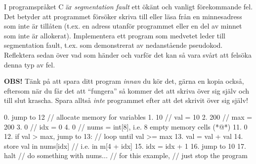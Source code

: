 \begin{Extrauppgifter}
    \item {}
    I programspråket C är \emph{segmentation fault} ett ökänt och vanligt förekommande fel. Det betyder att programmet försöker skriva till eller läsa från en minnesadress som inte är tillåten (t.ex. en adress utanför programmet eller en del av minnet som inte är allokerat).    
    Implementera ett program som medvetet leder till segmentation fault, t.ex. som demonstrerat av nedanstående pseudokod. Reflektera sedan över vad som händer och varför det kan så vara svårt att felsöka denna typ av fel.

    \halfblankline
    \textbf{OBS!} Tänk på att spara ditt program \emph{innan} du kör det, gärna en kopia också, eftersom när du får det att ``fungera'' så kommer det att skriva över sig själv och till slut krascha. Spara alltså \emph{inte} programmet efter att det skrivit över sig själv!



 
    \begin{Code}
        0. jump to 12  // allocate memory for variables
        1. 10          // val = 10
        2. 200         // max = 200
        3. 0           // idx = 0
        4. 0           // nums = int[8], i.e. 8 empty memory cells
        (*@\dots@*)
       11. 0
       12. if val > max, jump to 13:   // loop until val >= max
       13.     val = val + val
       14.     store val in nums[idx]  // i.e. in m[4 + idx]
       15.     idx = idx + 1
       16.     jump to 10
       17. halt                        // do something with nums...
                                       // for this example,
                                       // just stop the program
    \end{Code}

\end{Extrauppgifter}

